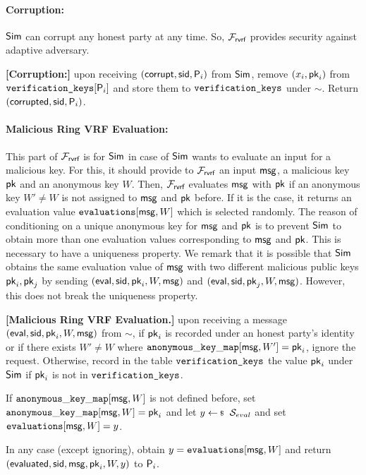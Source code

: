 \paragraph{Corruption:} $ \mathsf{Sim} $ can corrupt any honest party at any time.  So, $ \mathcal{F}_{\textsf{rvrf}} $ provides security against adaptive adversary.

\begin{tcolorbox}[left=2pt,right=2pt]
	\textbf{[Corruption:] } 
	upon receiving $ (\mathsf{corrupt}, \textsf{sid}, \mathsf{P}_i) $ from $ \mathsf{Sim} $, remove $ (x_i,\mathsf{pk}_i) $ from $ \texttt{verification\_keys}[\mathsf{P}_i] $ and store them to $ \texttt{verification\_keys} $ under $ \sim $. Return $ (\mathsf{corrupted}, \textsf{sid},\mathsf{P}_i) $.
\end{tcolorbox}

\paragraph{Malicious Ring VRF Evaluation:} This part of $ \mathcal{F}_{\textsf{rvrf}} $ is for $ \mathsf{Sim} $ in case of $ \mathsf{Sim} $ wants to evaluate an input for a malicious key. For this,  it should provide to $ \mathcal{F}_{\textsf{rvrf}} $ an input $ \mathsf{msg} $, a malicious key $ \mathsf{pk} $ and an anonymous key $ W $.  Then, $ \mathcal{F}_{\textsf{rvrf}} $ evaluates  $ \mathsf{msg} $ with $ \mathsf{pk} $ if an anonymous key $ W' \neq W$  is not assigned to $ \mathsf{msg} $ and $ \mathsf{pk} $ before.  If it is the case, it returns an evaluation value $ \texttt{evaluations}[\mathsf{msg}, W] $ which is selected randomly. The reason of conditioning on a unique anonymous key for $ \mathsf{msg} $ and $ \mathsf{pk} $ is to prevent $ \mathsf{Sim} $ to obtain more than one evaluation values corresponding to $ \mathsf{msg} $ and $ \mathsf{pk} $. This is necessary to have a uniqueness property.
We remark that it is possible that $ \mathsf{Sim} $ obtains the same evaluation value of $ \mathsf{msg} $ with two different malicious public keys $ \mathsf{pk}_i, \mathsf{pk}_j $ by sending $ (\mathsf{eval}, \textsf{sid}, \mathsf{pk}_i, W, \mathsf{msg}) $ and $(\mathsf{eval}, \textsf{sid}, \mathsf{pk}_j, W, \mathsf{msg})$. However, this does not break the uniqueness property.

\begin{tcolorbox}[left=2pt,right=2pt]
	\textbf{[Malicious Ring VRF Evaluation.]}  upon receiving a message $(\mathsf{eval}, \textsf{sid}, \mathsf{pk}_i, W, \mathsf{msg})$ from $\sim$, if $ \mathsf{pk}_i $ is recorded under an honest party's identity or if there exists $ W'\neq W $ where $ \mathtt{anonymous\_key\_map}[\mathsf{msg},W'] = \mathsf{pk}_i $, ignore the request.
	Otherwise, record in the table $\texttt{verification\_keys}$ the value $\mathsf{pk}_i$ under $\mathsf{Sim}$ if $ \mathsf{pk}_i $ is not in $ \texttt{verification\_keys} $.
	
	If  $\mathtt{anonymous\_key\_map}[\mathsf{msg},W]  $ is not defined before, set $ \mathtt{anonymous\_key\_map}[\mathsf{msg},W] = \mathsf{pk}_i $ and let   $y \leftsample \setsym{S}_{eval}$ and set $ \texttt{evaluations}[\mathsf{msg}, W] = y$.
	
	In any case (except ignoring), obtain $ y = \texttt{evaluations}[\mathsf{msg}, W] $ and return $(\mathsf{evaluated}, \textsf{sid},  \mathsf{msg}, \mathsf{pk}_i,W, y)$ to $ \mathsf{P}_i $.
\end{tcolorbox}

